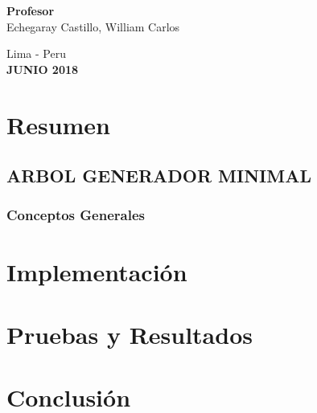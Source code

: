 \documentclass[a4paper]{article}
\begin{document}
\begin{titlepage}
\begin{center}
\vspace*{0.4in}
\begin{large}
{\bf Profesor} 
\vspace*{0.1in}
\\Echegaray Castillo, William Carlos
\end{large}

\end{center}
\begin{center}
\begin{large}
\vspace*{0.5in}
Lima - Peru\\
{\bf JUNIO 2018}
\end{large}
\end{center}
\end{titlepage}

\pagebreak
\tableofcontents
\pagebreak

\section{Resumen}
\subsection{ARBOL GENERADOR MINIMAL}
\subsubsection{Conceptos Generales}
\section{Implementaci\'on}
\section{Pruebas y Resultados}
\section{Conclusi\'on}
\end{document}
